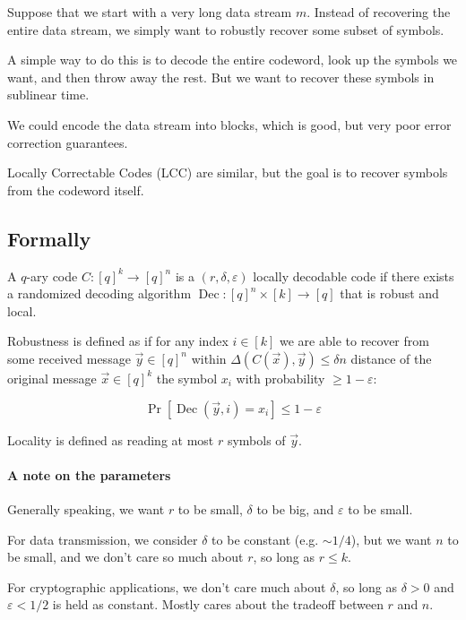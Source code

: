 \documentclass{idc_msc}
\DeclareMathOperator*{\Dec}{Dec}
\begin{document}
Suppose that we start with a very long data stream \(m\).
Instead of recovering the entire data stream, we simply want to robustly recover some subset of symbols.

A simple way to do this is to decode the entire codeword, look up the symbols we want, and then throw away the rest.
But we want to recover these symbols in sublinear time.

We could encode the data stream into blocks, which is good, but very poor error correction guarantees.

Locally Correctable Codes (LCC) are similar, but the goal is to recover symbols from the codeword itself.

\subsection{Formally}

A \(q\)-ary code \(C : [q]^k \to [q]^n\) is a \((r, \delta, \varepsilon)\) locally decodable code if there exists a randomized decoding algorithm \(\Dec : [q]^n \times [k] \to [q]\) that is robust and local.

Robustness is defined as if for any index \(i \in [k]\) we are able to recover from some received message \(\vec{y} \in [q]^n\) within \(\Delta(C(\vec{x}),\vec{y}) \le \delta n\) distance of the original message \(\vec{x} \in [q]^k\) the symbol \(x_i\) with probability \(\ge 1 - \varepsilon\):

\[\Pr[\Dec(\vec{y}, i) = x_i] \le 1 - \varepsilon\]

Locality is defined as reading at most \(r\) symbols of \(\vec{y}\).


\paragraph{A note on the parameters}

Generally speaking, we want \(r\) to be small, \(\delta\) to be big, and \(\varepsilon\) to be small.

For data transmission, we consider \(\delta\) to be constant (e.g. \(\sim 1/4\)), but we want \(n\) to be small, and we don't care so much about \(r\), so long as \(r \le k\).

For cryptographic applications, we don't care much about \(\delta\), so long as \(\delta > 0\) and \(\varepsilon < 1/2\) is held as constant.
Mostly cares about the tradeoff between \(r\) and \(n\).
\end{document}
